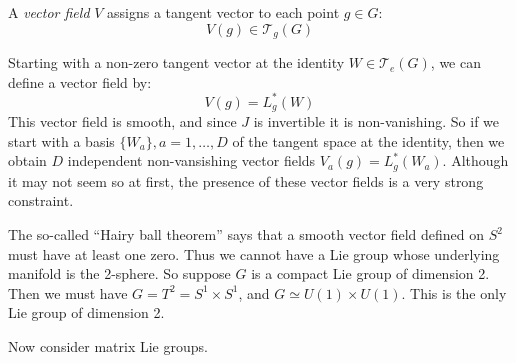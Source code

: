 \documentclass{jknotes}
\begin{document}
\begin{defn}
    A \emph{vector field} \(V\) assigns a tangent vector to each point \(g \in G\):
    \begin{equation}
        V(g) \in \mathcal{T}_g(G)
    \end{equation}
\end{defn}
Starting with a non-zero tangent vector at the identity \(W \in \mathcal{T}_e(G)\), we can define a vector field by:
\begin{equation}
    V(g) = L_g^*(W)
\end{equation}
This vector field is smooth, and since \(J\) is invertible it is non-vanishing. So if we start with a basis \(\{W_a\}, a=1,\ldots,D\) of the tangent space at the identity, then we obtain \(D\) independent non-vansishing vector fields \(V_a(g)=L_g^*(W_a)\). Although it may not seem so at first, the presence of these vector fields is a very strong constraint.
\begin{eg}
    The so-called ``Hairy ball theorem'' says that a smooth vector field defined on \(S^2\) must have at least one zero. Thus we cannot have a Lie group whose underlying manifold is the 2-sphere. So suppose \(G\) is a compact Lie group of dimension 2. Then we must have \(G=T^2=S^1\times S^1\), and \(G \simeq U(1)\times U(1)\). This is the only Lie group of dimension 2.
\end{eg}

Now consider matrix Lie groups.
\end{document}

